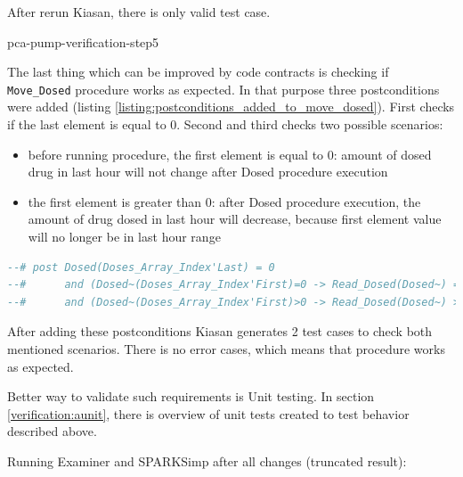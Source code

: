 After rerun Kiasan, there is only valid test case.

pca-pump-verification-step5

The last thing which can be improved by code contracts is checking if \lstinline{Move_Dosed} procedure works as expected. In that purpose three postconditions were added (listing \ref{listing:postconditions_added_to_move_dosed}). First checks if the last element is equal to 0. Second and third checks two possible scenarios: 
\begin{itemize}
    \item before running procedure, the first element is equal to 0: amount of dosed drug in last hour will not change after Dosed procedure execution
    \item the first element is greater than 0: after Dosed procedure execution, the amount of drug dosed in last hour will decrease, because first element value will no longer be in last hour range
\end{itemize}

\singlespacing
\begin{lstlisting}[language=ada, frame=single, gobble=0, caption={Postconditions added to Move\_Dosed procedure}, label={listing:postconditions_added_to_move_dosed}]
--# post Dosed(Doses_Array_Index'Last) = 0 
--#      and (Dosed~(Doses_Array_Index'First)=0 -> Read_Dosed(Dosed~) = Read_Dosed(Dosed))
--#      and (Dosed~(Doses_Array_Index'First)>0 -> Read_Dosed(Dosed~) > Read_Dosed(Dosed));
\end{lstlisting}
\doublespacing

After adding these postconditions Kiasan generates 2 test cases to check both mentioned scenarios. There is no error cases, which means that procedure works as expected.

Better way to validate such requirements is Unit testing. In section \ref{verification:aunit}, there is overview of unit tests created to test behavior described above.

Running Examiner and SPARKSimp after all changes (truncated result):

